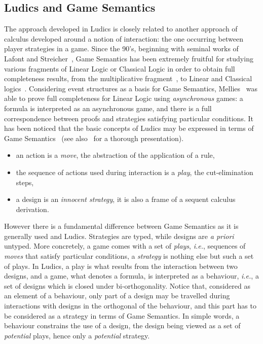 \documentclass{LMCS}
\def\ie{{\em i.e.}}
\begin{document}
{\subsection{Ludics and Game Semantics} The approach developed in Ludics is closely related to another approach of calculus developed around a notion of interaction: the one occurring between player strategies in a game. Since the 90's,  beginning with seminal works of Lafont and Streicher~\cite{DBLP:conf/lics/LafontS91}, Game Semantics has been extremely fruitful for studying various fragments of Linear Logic or Classical Logic  in order to obtain 
full completeness results, from the multiplicative fragment~\cite{HylandOng93, DBLP:journals/jsyml/AbramskyJ94, DBLP:conf/lics/Loader94, DBLP:conf/lics/DevarajanHPP99,DBLP:conf/lics/AbramskyM99,DBLP:conf/lics/Lamarche95}, to Linear and Classical logics~\cite{Laurent04, Laurent05a,DalLagoLaurent08a,Laurent10}.  Considering event structures as a basis for Game Semantics, Mellies~\cite{DBLP:conf/lics/Mellies05, DBLP:conf/lics/MelliesT07} was able to prove full completeness for Linear Logic using {\em asynchronous} games: a formula is interpreted as an asynchronous game, and there is a full correspondence between proofs and strategies satisfying particular conditions.
It has 
been noticed that the basic concepts of Ludics may be expressed in terms of Game Semantics~\cite{DBLPconf/csl/Faggian02, DBLP:conf/csl/CurienF05,  DBLP:journals/corr/abs-cs-0501039} (see also~\cite{DBLP:journals/corr/abs-1104-0504} for a thorough presentation).
\begin{itemize}
\item an action is a {\em move}, the  abstraction of the application of a rule,
\item the sequence of actions used during interaction is a {\em play}, the cut-elimination steps,
\item a design is an {\em innocent strategy}, it is also a frame of a sequent calculus derivation.
\end{itemize}
However there is a fundamental difference between Game Semantics as it is generally used and Ludics.
Strategies are typed, while designs are {\it a priori} untyped.
More concretely, a game comes with a set of {\em plays}, \ie, sequences of {\em moves} that satisfy particular conditions, a {\em strategy} is nothing else but such a set of plays. In Ludics, a play is what results from the interaction between two designs, and 
 a game, what denotes a formula,
 is interpreted as a behaviour, \ie, a set of designs which is closed under bi-orthogonality. 
Notice that, considered as an element of a behaviour, only part of a design may be travelled during interactions with designs in the orthogonal of the behaviour, and this part has to be considered as a strategy in terms of Game Semantics.
In simple words, a behaviour constrains the use of a design, the design being viewed as a set of {\em potential} plays, hence only a {\em potential} strategy.


}
\end{document}
